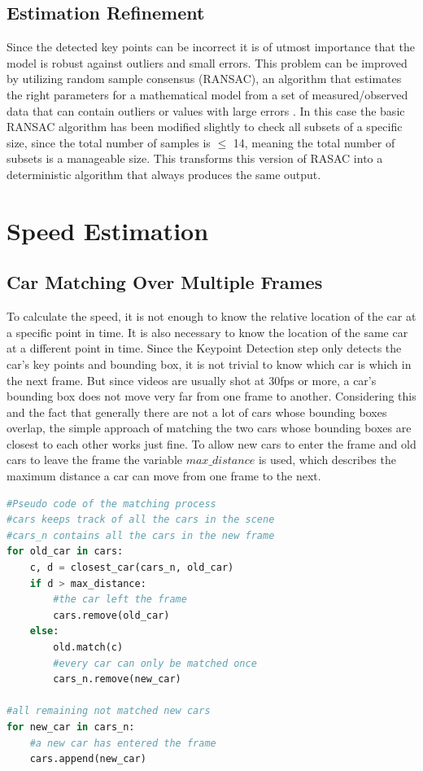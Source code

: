 \documentclass[conference]{IEEEtran}
\begin{document}
\subsection{Estimation Refinement}

Since the detected key points can be incorrect it is of utmost importance that the model is robust against outliers and small errors. This problem can be improved by utilizing random sample consensus (RANSAC), an algorithm that estimates the right parameters for a mathematical model from a set of measured/observed data that can contain outliers or values with large errors \cite{RANSAC}. In this case the basic RANSAC algorithm has been modified slightly to check all subsets of a specific size, since the total number of samples is $\leq$ 14, meaning the total number of subsets is a manageable size. This transforms this version of RASAC into a deterministic algorithm that always produces the same output.

\section{Speed Estimation}

\subsection{Car Matching Over Multiple Frames}

To calculate the speed, it is not enough to know the relative location of the car at a specific point in time. It is also necessary to know the location of the same car at a different point in time. Since the Keypoint Detection step only detects the car's key points and bounding box, it is not trivial to know which car is which in the next frame. But since videos are usually shot at 30fps or more, a car's bounding box does not move very far from one frame to another. Considering this and the fact that generally there are not a lot of cars whose bounding boxes overlap, the simple approach of matching the two cars whose bounding boxes are closest to each other works just fine. To allow new cars to enter the frame and old cars to leave the frame the variable $max\_distance$ is used, which describes the maximum distance a car can move from one frame to the next.


\begin{lstlisting}[language=Python, basicstyle=\small, tabsize=4]
#Pseudo code of the matching process
#cars keeps track of all the cars in the scene
#cars_n contains all the cars in the new frame
for old_car in cars:
    c, d = closest_car(cars_n, old_car)
    if d > max_distance:
        #the car left the frame
        cars.remove(old_car)
    else:
        old.match(c)
        #every car can only be matched once
        cars_n.remove(new_car)

#all remaining not matched new cars
for new_car in cars_n: 
    #a new car has entered the frame 
    cars.append(new_car) 
\end{lstlisting}
\end{document}
